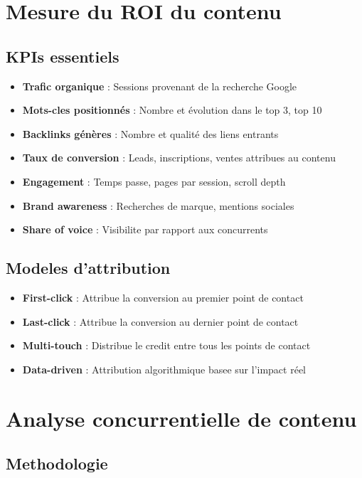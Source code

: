 \section{Mesure du ROI du contenu}

\subsection{KPIs essentiels}

\begin{itemize}
    \item \textbf{Trafic organique} : Sessions provenant de la recherche Google
    \item \textbf{Mots-cles positionnés} : Nombre et évolution dans le top 3, top 10
    \item \textbf{Backlinks génères} : Nombre et qualité des liens entrants
    \item \textbf{Taux de conversion} : Leads, inscriptions, ventes attribues au contenu
    \item \textbf{Engagement} : Temps passe, pages par session, scroll depth
    \item \textbf{Brand awareness} : Recherches de marque, mentions sociales
    \item \textbf{Share of voice} : Visibilite par rapport aux concurrents
\end{itemize}

\subsection{Modeles d'attribution}

\begin{itemize}
    \item \textbf{First-click} : Attribue la conversion au premier point de contact
    \item \textbf{Last-click} : Attribue la conversion au dernier point de contact
    \item \textbf{Multi-touch} : Distribue le credit entre tous les points de contact
    \item \textbf{Data-driven} : Attribution algorithmique basee sur l'impact réel
\end{itemize}

\section{Analyse concurrentielle de contenu}

\subsection{Methodologie}

